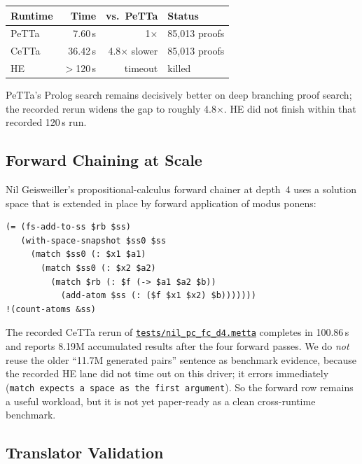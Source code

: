 \documentclass[11pt]{article}
\newcommand{\code}[1]{\texttt{#1}}
\newcommand{\PeTTa}{\textup{PeTTa}}
\newcommand{\HE}{\textup{HE}}
\newcommand{\CeTTa}{\textup{CeTTa}}
\begin{document}
\begin{center}
\begin{tabular}{lrrl}
\toprule
Runtime & Time & vs.\ \PeTTa{} & Status \\
\midrule
\PeTTa{} & 7.60\,s  & 1$\times$          & 85{,}013 proofs \\
\CeTTa{} & 36.42\,s & 4.8$\times$ slower & 85{,}013 proofs \\
\HE{}    & $>$120\,s & timeout            & killed \\
\bottomrule
\end{tabular}
\end{center}

\PeTTa{}'s Prolog search remains decisively better on deep branching
proof search; the recorded rerun widens the gap to roughly
4.8$\times$.  \HE{} did not finish within that recorded 120\,s run.

\subsection{Forward Chaining at Scale}

Nil Geisweiller's propositional-calculus forward chainer at depth~4
uses a solution space that is extended in place by forward application
of modus ponens:
\begin{lstlisting}[language={},basicstyle=\ttfamily\scriptsize]
(= (fs-add-to-ss $rb $ss)
   (with-space-snapshot $ss0 $ss
     (match $ss0 (: $x1 $a1)
       (match $ss0 (: $x2 $a2)
         (match $rb (: $f (-> $a1 $a2 $b))
           (add-atom $ss (: ($f $x1 $x2) $b)))))))
!(count-atoms &ss)
\end{lstlisting}
The recorded \CeTTa{} rerun of
\href{https://github.com/zariuq/CeTTa/blob/07928677c0237a19b2f3c32dffca28d7d2626723/tests/nil_pc_fc_d4.metta}{\code{tests/nil\_pc\_fc\_d4.metta}}
completes in 100.86\,s and reports 8.19M accumulated results after the
four forward passes.  We do \emph{not} reuse the older
``11.7M generated pairs'' sentence as benchmark evidence, because the
recorded HE lane did not time out on this driver; it errors immediately
(\code{match expects a space as the first argument}).  So the forward
row remains a useful workload, but it is not yet paper-ready as a clean
cross-runtime benchmark.

\subsection{Translator Validation}
\end{document}

